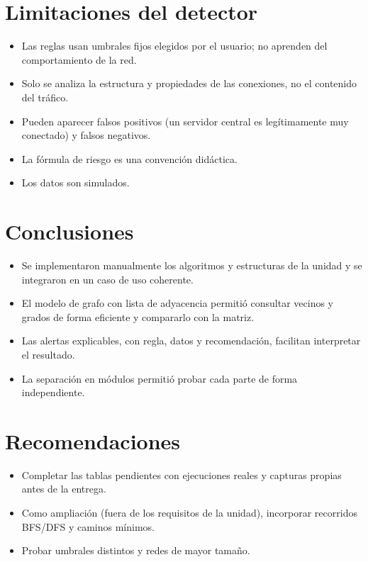 \documentclass[12pt,a4paper]{article}
\begin{document}
\section{Limitaciones del detector}
\begin{itemize}
  \item Las reglas usan umbrales fijos elegidos por el usuario; no aprenden del comportamiento de la red.
  \item Solo se analiza la estructura y propiedades de las conexiones, no el contenido del tráfico.
  \item Pueden aparecer falsos positivos (un servidor central es legítimamente muy conectado) y falsos negativos.
  \item La fórmula de riesgo es una convención didáctica.
  \item Los datos son simulados.
\end{itemize}

\section{Conclusiones}
\begin{itemize}
  \item Se implementaron manualmente los algoritmos y estructuras de la unidad y se integraron en un caso de uso coherente.
  \item El modelo de grafo con lista de adyacencia permitió consultar vecinos y grados de forma eficiente y compararlo con la matriz.
  \item Las alertas explicables, con regla, datos y recomendación, facilitan interpretar el resultado.
  \item La separación en módulos permitió probar cada parte de forma independiente.
\end{itemize}

\section{Recomendaciones}
\begin{itemize}
  \item Completar las tablas pendientes con ejecuciones reales y capturas propias antes de la entrega.
  \item Como ampliación (fuera de los requisitos de la unidad), incorporar recorridos BFS/DFS y caminos mínimos.
  \item Probar umbrales distintos y redes de mayor tamaño.
\end{itemize}
\end{document}

